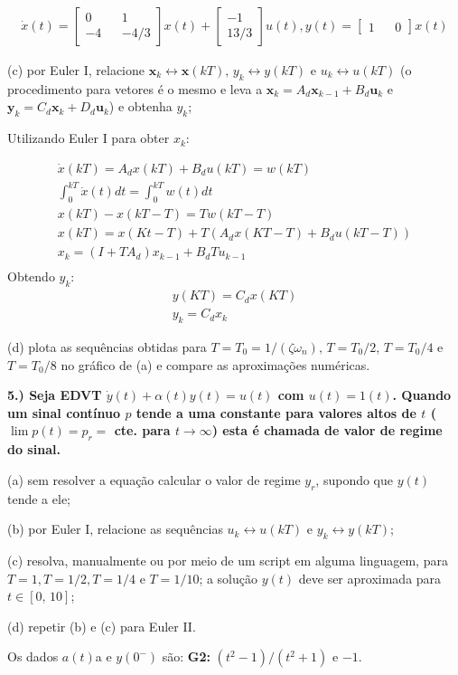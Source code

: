\documentclass[10pt]{article}
\newcommand{\bm}[1]{\boldsymbol{#1}}
\begin{document}
\begin{align*}
    \dot{x}(t) =
    \begin{bmatrix}
        0 && 1 \\
        -4 && -4/3
    \end{bmatrix}
    x(t) +
    \begin{bmatrix}
        -1 \\
        13/3
    \end{bmatrix}
    u(t), y(t) =
    \begin{bmatrix}
        1 && 0
    \end{bmatrix}
    x(t)
\end{align*}

(c) por Euler I, relacione $\bm{x}_k \leftrightarrow \bm{x}(kT), \, y_k \leftrightarrow y(kT)$ e $u_k \leftrightarrow u(kT)$ (o procedimento para vetores é o mesmo e leva a $\bm{x}_k = A_d \bm{x}_{k - 1} + B_d \bm{u}_k$ e $\bm{y}_k = C_d \bm{x}_k + D_d \bm{u}_k$) e obtenha $y_k$;

Utilizando Euler I para obter $x_k$:

\begin{align*}
    \dot{x}(kT) = A_dx(kT) + B_du(kT) = w(kT) \\
    \int_0^{kT}{\dot{x}(t)dt} = \int_0^{kT}{w(t)dt} \\
    x(kT) - x(kT - T) = Tw(kT - T) \\
    x(kT) = x(Kt - T) + T(A_dx(KT - T) + B_du(kT - T)) \\
    x_{k} = (I + TA_d)x_{k-1} + B_dTu_{k-1} \\
\end{align*}
Obtendo $y_k$:
\begin{align*}
    y(KT) = C_dx(KT) \\
    y_k = C_dx_k
\end{align*}

(d) plota as sequências obtidas para $T = T_0 = 1 / (\zeta \omega_n), \, T = T_0/2, \, T = T_0/4$ e $T = T_0/8$ no gráfico de (a) e compare as aproximações numéricas.


\vspace{\baselineskip}

\textbf{5.) Seja EDVT $\dot{y}(t) + \alpha(t)y(t) = u(t)$ com $u(t) = 1(t)$. Quando um sinal contínuo $p$ tende a uma constante para valores altos de $t$ ($\lim p(t) = p_r = $ cte. para $t \to \infty$) esta é chamada de valor de regime do sinal.}

(a) sem resolver a equação calcular o valor de regime $y_r$, supondo que $y(t)$ tende a ele;

(b) por Euler I, relacione as sequências $u_k \leftrightarrow u(kT)$ e $y_k \leftrightarrow y(kT)$;

(c) resolva, manualmente ou por meio de um script em alguma linguagem, para $T = 1, T = 1/2, T = 1/4$ e $T = 1/10$; a solução $y(t)$ deve ser aproximada para $t \in [0, \, 10]$;

(d) repetir (b) e (c) para Euler II.

Os dados $a(t)$a e $y(0^-)$ são: \textbf{G2: }$(t^2 - 1)/(t^2 + 1)$ e $-1$.
\end{document}
